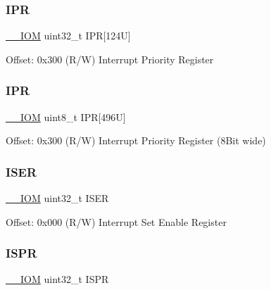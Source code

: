 \subsubsection{\texorpdfstring{I\+PR}{IPR}\hspace{0.1cm}{\footnotesize\ttfamily [1/2]}}
{\footnotesize\ttfamily \mbox{\hyperlink{core__cm4_8h_ab6caba5853a60a17e8e04499b52bf691}{\+\_\+\+\_\+\+I\+OM}} uint32\+\_\+t I\+PR\mbox{[}124\+U\mbox{]}}

Offset\+: 0x300 (R/W) Interrupt Priority Register \mbox{\label{struct_n_v_i_c___type_a18075001dceea9f3e328ab5db42c4caf}} 
\subsubsection{\texorpdfstring{I\+PR}{IPR}\hspace{0.1cm}{\footnotesize\ttfamily [2/2]}}
{\footnotesize\ttfamily \mbox{\hyperlink{core__cm4_8h_ab6caba5853a60a17e8e04499b52bf691}{\+\_\+\+\_\+\+I\+OM}} uint8\+\_\+t I\+PR\mbox{[}496\+U\mbox{]}}

Offset\+: 0x300 (R/W) Interrupt Priority Register (8\+Bit wide) \mbox{\label{struct_n_v_i_c___type_a040b60157eb7348b9325cb804333c48f}} 
\subsubsection{\texorpdfstring{I\+S\+ER}{ISER}}
{\footnotesize\ttfamily \mbox{\hyperlink{core__cm4_8h_ab6caba5853a60a17e8e04499b52bf691}{\+\_\+\+\_\+\+I\+OM}} uint32\+\_\+t I\+S\+ER}

Offset\+: 0x000 (R/W) Interrupt Set Enable Register \mbox{\label{struct_n_v_i_c___type_a19081cde0360514d37cefa9b5fdfc0fe}} 
\subsubsection{\texorpdfstring{I\+S\+PR}{ISPR}}
{\footnotesize\ttfamily \mbox{\hyperlink{core__cm4_8h_ab6caba5853a60a17e8e04499b52bf691}{\+\_\+\+\_\+\+I\+OM}} uint32\+\_\+t I\+S\+PR}

